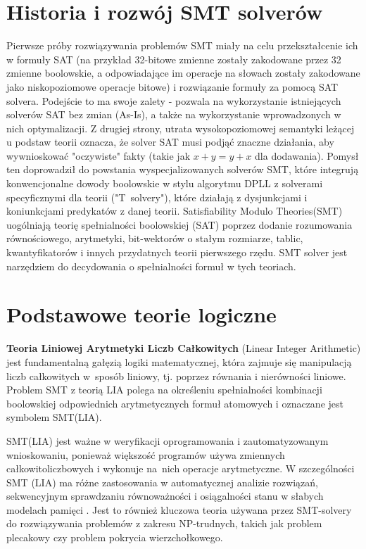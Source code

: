 \section{Historia i rozwój SMT solverów}
Pierwsze próby rozwiązywania problemów SMT miały na celu przekształcenie ich w formuły SAT (na przykład 32-bitowe zmienne zostały zakodowane przez 32 zmienne boolowskie, a odpowiadające im operacje na słowach zostały zakodowane jako niskopoziomowe operacje bitowe) i rozwiązanie formuły za pomocą SAT solvera. Podejście to ma swoje zalety - pozwala na wykorzystanie istniejących solverów SAT bez zmian (As-Is), a także na wykorzystanie wprowadzonych w nich optymalizacji. Z drugiej strony, utrata wysokopoziomowej semantyki leżącej u podstaw teorii oznacza, że solver SAT musi podjąć znaczne działania, aby wywnioskować "oczywiste" fakty (takie jak $x + y = y + x$ dla dodawania). Pomysł ten doprowadził do powstania wyspecjalizowanych solverów SMT, które integrują konwencjonalne dowody boolowskie w stylu algorytmu DPLL z solverami specyficznymi dla teorii ("T~solvery"), które działają z dysjunkcjami i koniunkcjami predykatów z danej teorii. 
Satisfiability Modulo Theories(SMT) uogólniają teorię spełnialności boolowskiej (SAT) poprzez dodanie rozumowania równościowego, arytmetyki, bit-wektorów o stałym rozmiarze, tablic, kwantyfikatorów i innych przydatnych teorii pierwszego rzędu.
SMT solver jest narzędziem do decydowania o spełnialności formuł w tych teoriach. 

\section{Podstawowe teorie logiczne}

\textbf{Teoria Liniowej Arytmetyki Liczb Całkowitych} (Linear Integer Arithmetic) jest fundamentalną gałęzią logiki matematycznej, która zajmuje się manipulacją liczb całkowitych w~sposób liniowy, tj. poprzez równania i nierówności liniowe. Problem SMT z teorią LIA polega na określeniu spełnialności kombinacji boolowskiej odpowiednich arytmetycznych formuł atomowych i oznaczane jest symbolem SMT(LIA). 

SMT(LIA) jest ważne w weryfikacji oprogramowania i zautomatyzowanym wnioskowaniu, ponieważ większość programów używa zmiennych całkowitoliczbowych i wykonuje na~nich operacje arytmetyczne. W szczególności SMT (LIA) ma różne zastosowania w automatycznej analizie rozwiązań, sekwencyjnym sprawdzaniu równoważności i osiągalności stanu w słabych modelach pamięci \cite{CaiLZ22}. Jest to również kluczowa teoria używana przez SMT-solvery do rozwiązywania problemów z zakresu NP-trudnych, takich jak problem plecakowy czy problem pokrycia wierzchołkowego.

